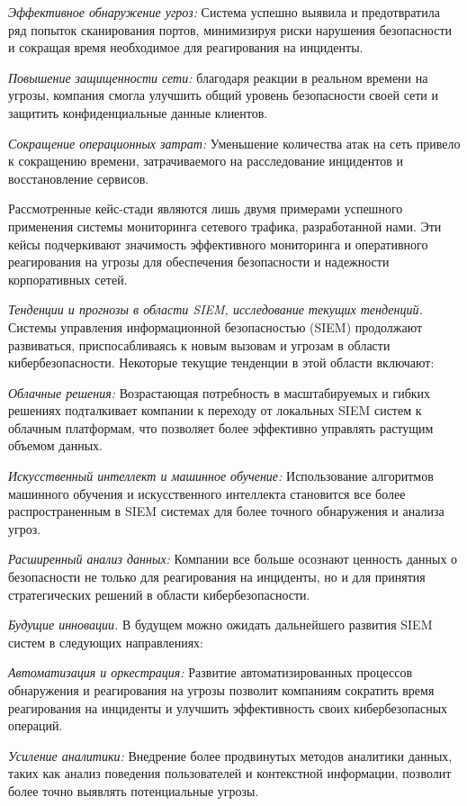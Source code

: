 \emph{Эффективное обнаружение угроз:} Система успешно выявила и
предотвратила ряд попыток сканирования портов, минимизируя риски
нарушения безопасности и сокращая время необходимое для реагирования на
инциденты.

\emph{Повышение защищенности сети:} благодаря реакции в реальном времени
на угрозы, компания смогла улучшить общий уровень безопасности своей
сети и защитить конфиденциальные данные клиентов.

\emph{Сокращение операционных затрат:} Уменьшение количества атак на
сеть привело к сокращению времени, затрачиваемого на расследование
инцидентов и восстановление сервисов.

Рассмотренные кейс-стади являются лишь двумя примерами успешного
применения системы мониторинга сетевого трафика, разработанной нами. Эти
кейсы подчеркивают значимость эффективного мониторинга и оперативного
реагирования на угрозы для обеспечения безопасности и надежности
корпоративных сетей.

\emph{Тенденции и прогнозы в области SIEM, исследование текущих
тенденций.} Системы управления информационной безопасностью (SIEM)
продолжают развиваться, приспосабливаясь к новым вызовам и угрозам в
области кибербезопасности. Некоторые текущие тенденции в этой области
включают:

\emph{Облачные решения:} Возрастающая потребность в масштабируемых и
гибких решениях подталкивает компании к переходу от локальных SIEM
систем к облачным платформам, что позволяет более эффективно управлять
растущим объемом данных.

\emph{Искусственный интеллект и машинное обучение:} Использование
алгоритмов машинного обучения и искусственного интеллекта становится все
более распространенным в SIEM системах для более точного обнаружения и
анализа угроз.

\emph{Расширенный анализ данных:} Компании все больше осознают ценность
данных о безопасности не только для реагирования на инциденты, но и для
принятия стратегических решений в области кибербезопасности.

\emph{Будущие инновации.} В будущем можно ожидать дальнейшего развития
SIEM систем в следующих направлениях:

\emph{Автоматизация и оркестрация:} Развитие автоматизированных
процессов обнаружения и реагирования на угрозы позволит компаниям
сократить время реагирования на инциденты и улучшить эффективность своих
кибербезопасных операций.

\emph{Усиление аналитики:} Внедрение более продвинутых методов аналитики
данных, таких как анализ поведения пользователей и контекстной
информации, позволит более точно выявлять потенциальные угрозы.

